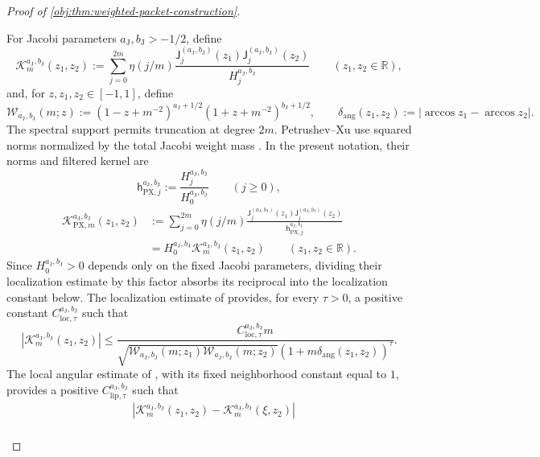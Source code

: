 \begin{proof}[Proof of \cref{obj:thm:weighted-packet-construction}]
\begin{enumerate}
For Jacobi parameters \(a_{\mathrm J},b_{\mathrm J}>-1/2\), define
\[
\mathcal K_m^{a_{\mathrm J},b_{\mathrm J}}(z_1,z_2)
:=
\sum_{j=0}^{2m}\eta(j/m)
\frac{\mathsf J_j^{(a_{\mathrm J},b_{\mathrm J})}(z_1)
      \mathsf J_j^{(a_{\mathrm J},b_{\mathrm J})}(z_2)}
     {H_j^{a_{\mathrm J},b_{\mathrm J}}}
\qquad(z_1,z_2\in\mathbb R),
\]
and, for \(z,z_1,z_2\in[-1,1]\), define
\[
\mathcal W_{a_{\mathrm J},b_{\mathrm J}}(m;z)
:=
(1-z+m^{-2})^{a_{\mathrm J}+1/2}
(1+z+m^{-2})^{b_{\mathrm J}+1/2},
\qquad
\delta_{\mathrm{ang}}(z_1,z_2)
:=
|\arccos z_1-\arccos z_2|.
\]
The spectral support permits truncation at degree \(2m\). Petrushev--Xu use squared norms normalized by the total Jacobi weight mass
\citep[pp.~1--2, equation~(1.2)]{PetrushevXu2005}. In the present notation, their norms and filtered kernel are
\[
\mathsf h_{\mathrm{PX},j}^{a_{\mathrm J},b_{\mathrm J}}
:=\frac{H_j^{a_{\mathrm J},b_{\mathrm J}}}
        {H_0^{a_{\mathrm J},b_{\mathrm J}}}
\qquad(j\ge0),
\]
\[
\begin{split}
\mathcal K_{\mathrm{PX},m}^{a_{\mathrm J},b_{\mathrm J}}(z_1,z_2)
&:=\sum_{j=0}^{2m}\eta(j/m)
\frac{\mathsf J_j^{(a_{\mathrm J},b_{\mathrm J})}(z_1)
      \mathsf J_j^{(a_{\mathrm J},b_{\mathrm J})}(z_2)}
     {\mathsf h_{\mathrm{PX},j}^{a_{\mathrm J},b_{\mathrm J}}}\\
&=H_0^{a_{\mathrm J},b_{\mathrm J}}
  \mathcal K_m^{a_{\mathrm J},b_{\mathrm J}}(z_1,z_2)
\qquad(z_1,z_2\in\mathbb R).
\end{split}
\]
Since \(H_0^{a_{\mathrm J},b_{\mathrm J}}>0\) depends only on the fixed Jacobi parameters, dividing their localization estimate by this factor absorbs its reciprocal into the localization constant below. The localization estimate of
\citep[Theorem~2.4, equation~(2.14)]{PetrushevXu2005}
provides, for every \(\tau>0\), a positive constant
\(C_{\mathrm{loc},\tau}^{a_{\mathrm J},b_{\mathrm J}}\) such that
\[
|\mathcal K_m^{a_{\mathrm J},b_{\mathrm J}}(z_1,z_2)|
\le
\frac{C_{\mathrm{loc},\tau}^{a_{\mathrm J},b_{\mathrm J}}m}
{\sqrt{\mathcal W_{a_{\mathrm J},b_{\mathrm J}}(m;z_1)
       \mathcal W_{a_{\mathrm J},b_{\mathrm J}}(m;z_2)}
 (1+m\delta_{\mathrm{ang}}(z_1,z_2))^\tau}.
\]
The local angular estimate of
\citep[Theorem~2.2, equation~(2.4)]{https://people.math.sc.edu/pencho/Publications/kpx-06-28-06-web.pdf},
with its fixed neighborhood constant equal to \(1\), provides a positive
\(C_{\mathrm{lip},\tau}^{a_{\mathrm J},b_{\mathrm J}}\) such that
\[
\begin{split}
&|\mathcal K_m^{a_{\mathrm J},b_{\mathrm J}}(z_1,z_2)
 -\mathcal K_m^{a_{\mathrm J},b_{\mathrm J}}(\xi,z_2)|\\

\end{split}\]
\end{enumerate}
\end{proof}
